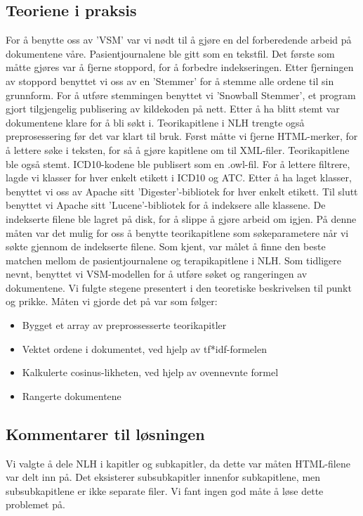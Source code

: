 \subsection{Teoriene i praksis}
For å benytte oss av 'VSM' var vi nødt til å gjøre en del forberedende arbeid på dokumentene våre. Pasientjournalene ble gitt som en tekstfil. Det første som måtte gjøres var å fjerne stoppord, for å forbedre indekseringen. Etter fjerningen av stoppord benyttet vi oss av en 'Stemmer' for å stemme alle ordene til sin grunnform. For å utføre stemmingen benyttet vi 'Snowball Stemmer', et program gjort tilgjengelig publisering av kildekoden på nett. 
Etter å ha blitt stemt var dokumentene klare for å bli søkt i.
Teorikapitlene i NLH trengte også preprosessering før det var klart til bruk. Først måtte vi fjerne HTML-merker, for å lettere søke i teksten, for så å gjøre kapitlene om til XML-filer. Teorikapitlene ble også stemt.
ICD10-kodene ble publisert som en .owl-fil. For å lettere filtrere, lagde vi klasser for hver enkelt etikett i ICD10 og ATC.
Etter å ha laget klasser, benyttet vi oss av Apache sitt 'Digester'-bibliotek for hver enkelt etikett. 
Til slutt benyttet vi Apache sitt 'Lucene'-bibliotek for å indeksere alle klassene. De indekserte filene ble lagret på disk, for å slippe å gjøre arbeid om igjen. På denne måten var det mulig for oss å benytte teorikapitlene som søkeparametere når vi søkte gjennom de indekserte filene. 
Som kjent, var målet å finne den beste matchen mellom de pasientjournalene og terapikapitlene i NLH. 
Som tidligere nevnt, benyttet vi VSM-modellen for å utføre søket og rangeringen av dokumentene. Vi fulgte stegene presentert i den teoretiske beskrivelsen til punkt og prikke. Måten vi gjorde det på var som følger:
\begin{itemize}
\item{Bygget et array av preprossesserte teorikapitler}
\item{Vektet ordene i dokumentet, ved hjelp av tf*idf-formelen}
\item{Kalkulerte cosinus-likheten, ved hjelp av ovennevnte formel}
\item{Rangerte dokumentene}
\end{itemize}

\subsection{Kommentarer til løsningen}
Vi valgte å dele NLH i kapitler og subkapitler, da dette var måten HTML-filene var delt inn på. Det eksisterer subsubkapitler innenfor subkapitlene, men subsubkapitlene er ikke separate filer. Vi fant ingen god måte å løse dette problemet på. 